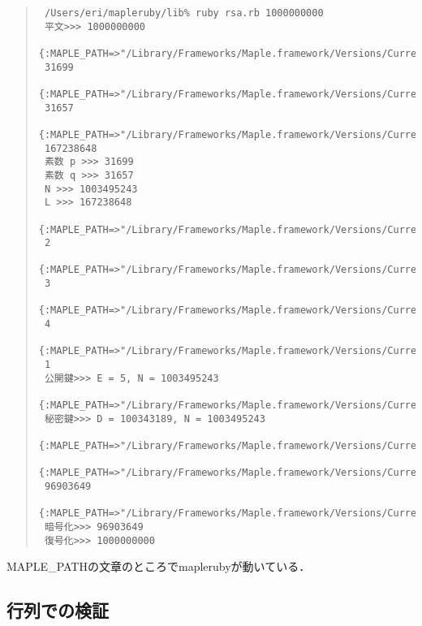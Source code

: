 \begin{quote}\begin{verbatim}
 /Users/eri/mapleruby/lib% ruby rsa.rb 1000000000
 平文>>> 1000000000
 {:MAPLE_PATH=>"/Library/Frameworks/Maple.framework/Versions/Current/bin/maple"}
 31699
 {:MAPLE_PATH=>"/Library/Frameworks/Maple.framework/Versions/Current/bin/maple"}
 31657
 {:MAPLE_PATH=>"/Library/Frameworks/Maple.framework/Versions/Current/bin/maple"}
 167238648
 素数 p >>> 31699
 素数 q >>> 31657
 N >>> 1003495243
 L >>> 167238648
 {:MAPLE_PATH=>"/Library/Frameworks/Maple.framework/Versions/Current/bin/maple"}
 2
 {:MAPLE_PATH=>"/Library/Frameworks/Maple.framework/Versions/Current/bin/maple"}
 3
 {:MAPLE_PATH=>"/Library/Frameworks/Maple.framework/Versions/Current/bin/maple"}
 4
 {:MAPLE_PATH=>"/Library/Frameworks/Maple.framework/Versions/Current/bin/maple"}
 1
 公開鍵>>> E = 5, N = 1003495243
 {:MAPLE_PATH=>"/Library/Frameworks/Maple.framework/Versions/Current/bin/maple"}
 秘密鍵>>> D = 100343189, N = 1003495243
 {:MAPLE_PATH=>"/Library/Frameworks/Maple.framework/Versions/Current/bin/maple"}
 {:MAPLE_PATH=>"/Library/Frameworks/Maple.framework/Versions/Current/bin/maple"}
 96903649
 {:MAPLE_PATH=>"/Library/Frameworks/Maple.framework/Versions/Current/bin/maple"}
 暗号化>>> 96903649
 復号化>>> 1000000000
\end{verbatim}\end{quote}
MAPLE\_PATHの文章のところでmaplerubyが動いている．

\subsection{行列での検証}
